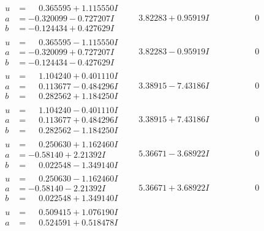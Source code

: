 \documentclass[1p]{elsarticle_modified}
\theoremstyle{definition}
\begin{document}
$$\begin{array}{c|c|c}
\begin{aligned}
u &= \phantom{-}0.365595 + 1.115550 I \\
a &= -0.320099 - 0.727207 I \\
b &= -0.124434 + 0.427629 I\end{aligned}
 & \phantom{-}3.82283 + 0.95919 I & \phantom{-0.000000 } 0 \\ \hline\begin{aligned}
u &= \phantom{-}0.365595 - 1.115550 I \\
a &= -0.320099 + 0.727207 I \\
b &= -0.124434 - 0.427629 I\end{aligned}
 & \phantom{-}3.82283 - 0.95919 I & \phantom{-0.000000 } 0 \\ \hline\begin{aligned}
u &= \phantom{-}1.104240 + 0.401110 I \\
a &= \phantom{-}0.113677 - 0.484296 I \\
b &= \phantom{-}0.282562 + 1.184250 I\end{aligned}
 & \phantom{-}3.38915 - 7.43186 I & \phantom{-0.000000 } 0 \\ \hline\begin{aligned}
u &= \phantom{-}1.104240 - 0.401110 I \\
a &= \phantom{-}0.113677 + 0.484296 I \\
b &= \phantom{-}0.282562 - 1.184250 I\end{aligned}
 & \phantom{-}3.38915 + 7.43186 I & \phantom{-0.000000 } 0 \\ \hline\begin{aligned}
u &= \phantom{-}0.250630 + 1.162460 I \\
a &= -0.58140 + 2.21392 I \\
b &= \phantom{-}0.022548 - 1.349140 I\end{aligned}
 & \phantom{-}5.36671 - 3.68922 I & \phantom{-0.000000 } 0 \\ \hline\begin{aligned}
u &= \phantom{-}0.250630 - 1.162460 I \\
a &= -0.58140 - 2.21392 I \\
b &= \phantom{-}0.022548 + 1.349140 I\end{aligned}
 & \phantom{-}5.36671 + 3.68922 I & \phantom{-0.000000 } 0 \\ \hline\begin{aligned}
u &= \phantom{-}0.509415 + 1.076190 I \\
a &= \phantom{-}0.524591 + 0.518478 I \\

\end{aligned}
\end{array}$$
\end{document}
